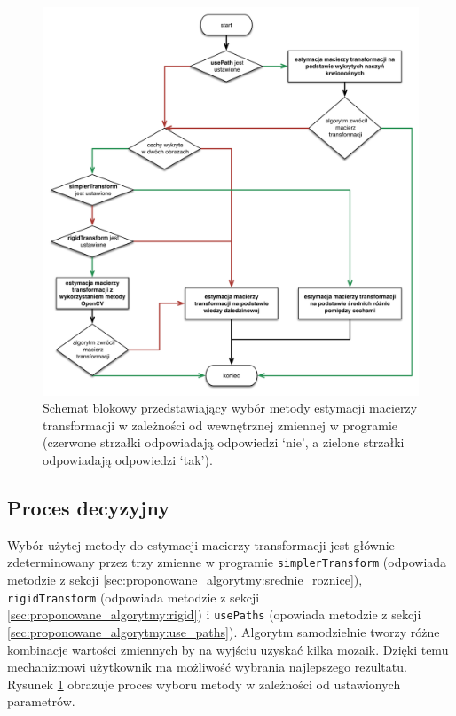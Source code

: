 \begin{figure}[htb]
  \centering
  \includegraphics[width=\textwidth]{gfx/decision_model}
  \caption{Schemat blokowy przedstawiający wybór metody estymacji macierzy transformacji w zależności od wewnętrznej zmiennej w programie (czerwone strzałki odpowiadają odpowiedzi `nie', a zielone strzałki odpowiadają odpowiedzi `tak').}
  \label{fig:proponowane_algorytmy:decision_model}
\end{figure}

\subsection{Proces decyzyjny}
\label{sec:proponowane_algorytmy:proces_decyzyjny}

Wybór użytej metody do estymacji macierzy transformacji jest głównie zdeterminowany przez trzy zmienne w programie \texttt{simplerTransform} (odpowiada metodzie z sekcji \ref{sec:proponowane_algorytmy:srednie_roznice}), \texttt{rigidTransform} (odpowiada metodzie z sekcji \ref{sec:proponowane_algorytmy:rigid}) i \texttt{usePaths} (opowiada metodzie z sekcji \ref{sec:proponowane_algorytmy:use_paths}). Algorytm samodzielnie tworzy różne kombinacje wartości zmiennych by na wyjściu uzyskać kilka mozaik. Dzięki temu mechanizmowi użytkownik ma możliwość wybrania najlepszego rezultatu. Rysunek \ref{fig:proponowane_algorytmy:decision_model} obrazuje proces wyboru metody w zależności od ustawionych parametrów.

